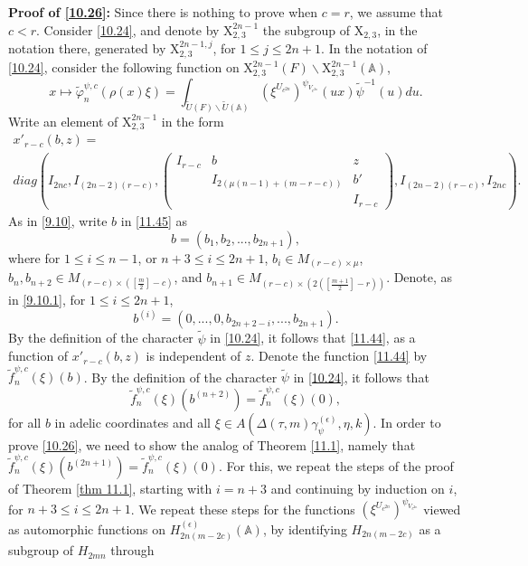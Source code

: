\documentclass[12pts]{amsart}
\newcommand{\BA}{{\mathbb {A}}}
\begin{document}
{\bf Proof of \eqref{10.26}:} Since there is nothing to prove when $c=r$, we assume that $c<r$. Consider \eqref{10.24}, and denote by $\mathrm{X}^{2n-1}_{2,3}$ the subgroup of $\mathrm{X}_{2,3}$, in the notation there, generated by $\mathrm{X}^{2n-1,j}_{2,3}$, for $1\leq j\leq 2n+1$. In the notation of \eqref{10.24}, consider the following function on $\mathrm{X}^{2n-1}_{2,3}(F)\backslash \mathrm{X}^{2n-1}_{2,3}(\BA)$,
\begin{equation}\label{11.44}
  x\mapsto \tilde{\varphi}_n^{\psi,c}(\rho(x)\xi)=\int_{\tilde{U}(F)\backslash \tilde{U}(\BA)}
(\xi^{U_{c^{2n}}})^{\psi_{V_{c^{2n}}}}(ux)\tilde{\psi}^{-1}(u)du.
\end{equation}
Write an element of
$\mathrm{X}^{2n-1}_{2,3}$ in the form
\begin{multline}\label{11.45}
x'_{r-c}(b,z)=\\
diag(I_{2nc}, I_{(2n-2)(r-c)}, \begin{pmatrix}I_{r-c}&b&z\\&I_{2(\mu(n-1)+(m-r-c))}&b'\\&&I_{r-c}\end{pmatrix}, I_{(2n-2)(r-c)},I_{2nc}).
\end{multline}
As in \eqref{9.10}, write $b$ in \eqref{11.45} as
\begin{equation}\label{11.46}
b=(b_1,b_2,...,b_{2n+1}),
\end{equation}
where for $1\leq i\leq n-1$, or $n+3\leq i\leq 2n+1$, $b_i\in M_{(r-c)\times \mu}$, $b_n, b_{n+2}\in M_{(r-c)\times ([\frac{m}{2}]-c)}$, and $b_{n+1}\in M_{(r-c)\times (2([\frac{m+1}{2}]-r))}$. Denote, as in \eqref{9.10.1}, for $1\leq i\leq 2n+1$,
$$
b^{(i)}=(0,...,0,b_{2n+2-i},...,b_{2n+1}).
$$
By the definition of the character $\tilde{\psi}$ in \eqref{10.24}, it follows that \eqref{11.44}, as a function of $x'_{r-c}(b,z)$ is independent of $z$. Denote the function \eqref{11.44} by $\tilde{f}_n^{\psi,c}(\xi)(b)$. By the definition of the character $\tilde{\psi}$ in \eqref{10.24}, it follows that 
\begin{equation}\label{11.47}
\tilde{f}_n^{\psi,c}(\xi)(b^{(n+2)})=\tilde{f}_n^{\psi,c}(\xi)(0),
\end{equation}
for all $b$ in adelic coordinates and all $\xi\in A(\Delta(\tau,m)\gamma_\psi^{(\epsilon)},\eta,k)$. In order to prove \eqref{10.26}, we need to show the analog of Theorem \ref{11.1}, namely that $\tilde{f}_n^{\psi,c}(\xi)(b^{(2n+1)})=\tilde{f}_n^{\psi,c}(\xi)(0)$. For this, we repeat the steps of the proof of Theorem \ref{thm 11.1}, starting with $i=n+3$ and continuing by induction on $i$, for $n+3\leq i\leq 2n+1$. We repeat these steps for the  functions $(\xi^{U_{c^{2n}}})^{\psi_{V_{c^{2n}}}}$ viewed as automorphic functions on $H_{2n(m-2c)}^{(\epsilon)}(\BA)$, by identifying $H_{2n(m-2c)}$ as a subgroup of $H_{2mn}$ through
\end{document}
